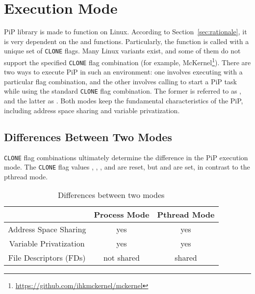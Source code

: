 
\section{Execution Mode}\label{sec:exec-mode}

PiP library is made to function on Linux. According to
Section~\ref{sec:rationale}, it is very dependent on the
 and  functions. Particularly, the
 function is called with a unique set of 
{\tt CLONE} flags. Many Linux variants exist, and some of them do not
support the specified {\tt CLONE} flag combination (for example,
McKernel\footnote{\url{https://github.com/ihkmckernel/mckernel}}). There
are two ways to execute PiP in such an environment: 
one involves executing  with a particular flag
combination, and the other involves calling 
to start a PiP task while using the standard {\tt CLONE} flag
combination. The former is referred to as , and
the latter as . Both modes keep the fundamental
characteristics of the PiP, including address space sharing and
variable privatization. 

\subsection{Differences Between Two Modes}

{\tt CLONE} flag combinations ultimately determine the difference in the
PiP execution mode. The {\tt CLONE} flag values ,
, , and
 are reset, but  and
 are set, in contrast to the 
pthread mode. 

\begin{table}[ht]
  \centering
  \caption{Differences between two modes}\label{tbl:mode-diff}
  \vspace{3mm}
  \begin{tabular}{c||c|c}
    \hline
    & Process Mode & Pthread Mode \\
    \hline
    \hline
    Address Space Sharing & yes & yes \\
    Variable Privatization & yes & yes \\
    File Descriptors (FDs) & not shared & shared \\
    \hline
  \end{tabular}
\end{table}

